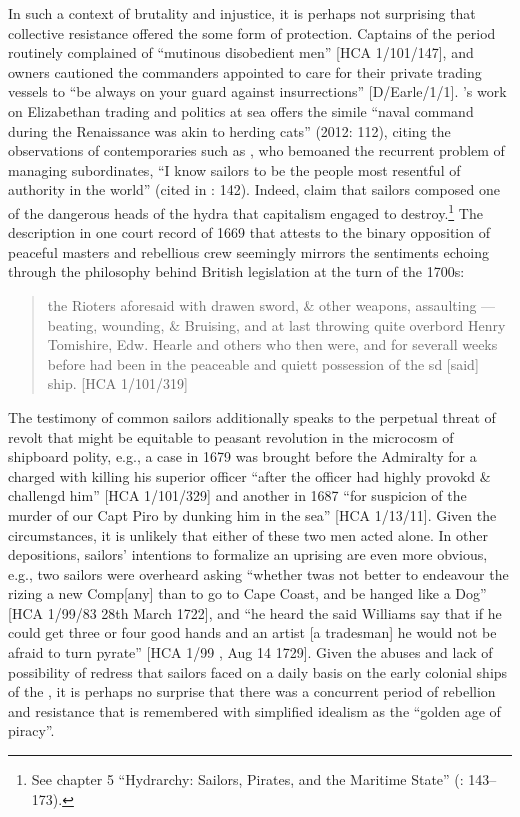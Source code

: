 In such a context of brutality and injustice, it is perhaps not surprising that collective resistance offered the  some form of protection. Captains of the period routinely complained of “mutinous disobedient men” [HCA 1/101/147], and owners cautioned the commanders appointed to care for their private trading vessels to “be always on your guard against insurrections” [D/Earle/1/1]. \citeauthor{Bicheno2012}’s work on Elizabethan trading and politics at sea offers the simile “naval command during the Renaissance was akin to herding cats” (2012: 112), citing the observations of contemporaries such as , who bemoaned the recurrent problem of managing subordinates, “I know sailors to be the people most resentful of authority in the world” (cited in \citealt{Bicheno2012}: 142). Indeed, \citet{LinebaughRediker2000} claim that sailors composed one of the dangerous heads of the hydra that capitalism engaged to destroy.\footnote{See chapter 5 “Hydrarchy: Sailors, Pirates, and the Maritime State”  (\citealt{LinebaughRediker2000}: 143–173).} The description in one court record of 1669 that attests to the binary opposition of peaceful masters and rebellious crew seemingly mirrors the sentiments echoing through the philosophy behind British legislation at the turn of the 1700s:

\begin{quotation}
the Rioters aforesaid with drawen sword, \& other weapons, assaulting — beating, wounding, \& Bruising, and at last throwing quite overbord Henry Tomishire, Edw. Hearle and others who then were, and for severall weeks before had been in the peaceable and quiett possession of the sd [said] ship. [HCA 1/101/319] 
\end{quotation}

The testimony of common sailors additionally speaks to the perpetual threat of revolt that might be equitable to peasant revolution in the microcosm of shipboard polity, e.g., a case in 1679 was brought before the Admiralty for a  charged with killing his superior officer “after the officer had highly provokd \& challengd him” [HCA 1/101/329] and another in 1687 “for suspicion of the murder of our Capt Piro by dunking him in the sea” [HCA 1/13/11]. Given the circumstances, it is unlikely that either of these two men acted alone. In other depositions, sailors’ intentions to formalize an uprising are even more obvious, e.g., two sailors were overheard asking “whether twas not better to endeavour the rizing a new Comp[any] than to go to Cape Coast, and be hanged like a Dog” [HCA 1/99/83 28th March {1722}], and “he heard the said Williams say that if he could get three or four good hands and an artist [a tradesman] he would not be afraid to turn pyrate” [HCA 1/99 , Aug 14 1729]. Given the abuses and lack of possibility of redress that sailors faced on a daily basis on the early colonial ships of the , it is perhaps no surprise that there was a concurrent period of rebellion and resistance that is remembered with simplified idealism as the “golden age of piracy”.

